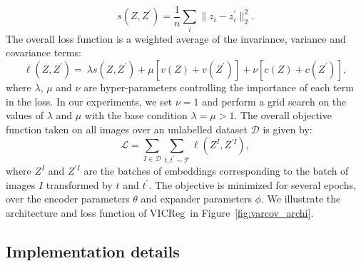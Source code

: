 \documentclass{article} %
\newcommand{\algo}{VICReg}
\newcommand{\expander}{expander }
\begin{document}
\begin{equation} \label{eq:invariance}
    s(Z, Z^{\prime}) = \frac{1}{n} \sum_i \|z_i - z^{\prime}_i\|_2^2.
\end{equation}
The overall loss function is a weighted average of the invariance, variance and covariance terms:
\begin{equation} \label{eq:loss}
    \ell(Z, Z^{\prime}) = \ \lambda s(Z, Z^{\prime}) + \mu [ v(Z) + v(Z^{\prime}) ] + \nu [ c(Z) + c(Z^{\prime}) ],
\end{equation}
where $\lambda$, $\mu$ and $\nu$ are hyper-parameters controlling the importance of each term in the loss. In our experiments, we set $\nu = 1$ and perform a grid search on the values of $\lambda$ and $\mu$ with the base condition $\lambda = \mu > 1$. The overall objective function taken on all images over an unlabelled dataset $\mathcal{D}$ is given by:
\begin{equation} \label{eq:final_loss}
    \mathcal{L} = \sum_{I \in \mathcal{D}} \sum_{t, t^{\prime} \sim \mathcal{T}} \ell(Z^{I}, Z^{\prime I}),
\end{equation}
where $Z^{I}$ and $Z^{\prime I}$ are the batches of embeddings corresponding to the batch of images $I$ transformed by $t$ and $t^{\prime}$. The objective is minimized for several epochs, over the encoder parameters $\theta$ and \expander parameters $\phi$. We illustrate the architecture and loss function of \algo \ in Figure~\ref{fig:varcov_archi}.\\
\setlength\intextsep{0pt}
\subsection{Implementation details} \label{sec:impl_details}
\end{document}
